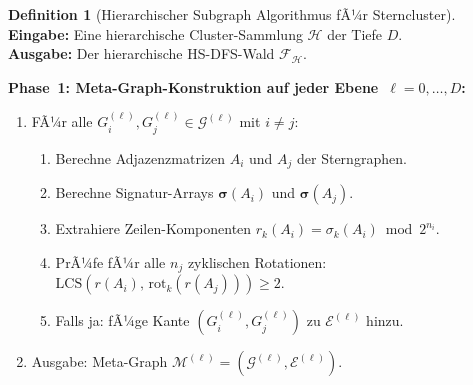 ﻿\documentclass[a4paper,12pt]{report}
\theoremstyle{definition}
\newtheorem{definition}{Definition}
\begin{document}
\begin{definition}[Hierarchischer Subgraph Algorithmus fÃ¼r Sterncluster]
\label{def:hsdfs_stars}
\textbf{Eingabe:} Eine hierarchische Cluster-Sammlung $\mathcal{H}$ der Tiefe $D$.\\
\textbf{Ausgabe:} Der hierarchische HS-DFS-Wald $\mathcal{F}_\mathcal{H}$.

\smallskip
\textbf{Phase~1: Meta-Graph-Konstruktion auf jeder Ebene~$\ell = 0,\ldots,D$:}
\begin{enumerate}
    \item FÃ¼r alle $G^{(\ell)}_i, G^{(\ell)}_j \in \mathcal{G}^{(\ell)}$ mit $i \neq j$:
    \begin{enumerate}
        \item Berechne Adjazenzmatrizen $A_i$ und $A_j$ der Sterngraphen.
        \item Berechne Signatur-Arrays $\boldsymbol{\sigma}(A_i)$ und $\boldsymbol{\sigma}(A_j)$.
        \item Extrahiere Zeilen-Komponenten $r_k(A_i) = \sigma_k(A_i) \bmod 2^{n_i}$.
        \item PrÃ¼fe fÃ¼r alle $n_j$ zyklischen Rotationen: $\mathrm{LCS}(r(A_i),\, \mathrm{rot}_k(r(A_j))) \geq 2$.
        \item Falls ja: fÃ¼ge Kante $(G^{(\ell)}_i, G^{(\ell)}_j)$ zu $\mathcal{E}^{(\ell)}$ hinzu.
    \end{enumerate}
    \item Ausgabe: Meta-Graph $\mathcal{M}^{(\ell)} = (\mathcal{G}^{(\ell)}, \mathcal{E}^{(\ell)})$.
\end{enumerate}


\end{definition}
\end{document}
